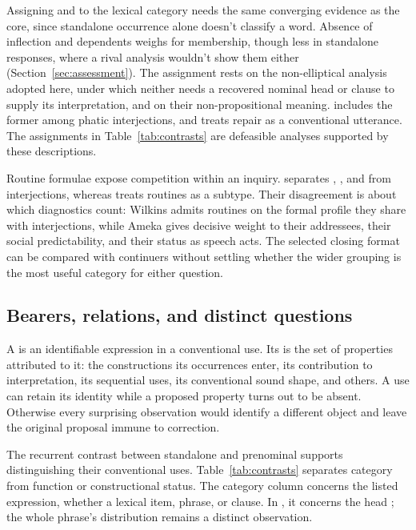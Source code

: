 \documentclass[12pt]{article}
\begin{document}
Assigning  and  to the lexical category
needs the same converging evidence as the core, since standalone occurrence
alone doesn't classify a word. Absence of inflection and dependents weighs for
membership, though less in standalone responses, where a rival analysis
wouldn't show them either (Section~\ref{sec:assessment}). The assignment rests on the
non-elliptical analysis adopted here, under which neither needs a recovered
nominal head or clause to supply its interpretation, and on their
non-propositional meaning. \textcite[114]{ameka1992}
includes the former among phatic interjections, and
\textcite[152]{wilkins1992} treats repair  as a conventional
utterance. The assignments in Table~\ref{tab:contrasts} are defeasible
analyses supported by these descriptions.

Routine formulae expose competition within an inquiry.
\textcite[108--110]{ameka1992} separates , ,
and  from interjections, whereas
\textcite[142]{wilkins1992} treats routines as a subtype. Their
disagreement is about which diagnostics count: Wilkins admits routines on
the formal profile they share with interjections, while Ameka gives
decisive weight to their addressees, their social predictability, and their
status as speech acts. The selected closing format can be
compared with continuers without settling whether the wider grouping
is the most useful category for either question.

\subsection{Bearers, relations, and distinct questions}

A  is an identifiable expression in a conventional use.
Its  is the set of properties attributed to it: the
constructions its occurrences enter, its contribution to interpretation,
its sequential uses, its conventional sound shape, and others. A use can retain its identity
while a proposed property turns out to be absent. Otherwise every
surprising observation would identify a different object and leave the
original proposal immune to correction.

The recurrent contrast between standalone and prenominal 
supports distinguishing their conventional uses. Table~\ref{tab:contrasts}
separates category from function or constructional status. The category
column concerns the listed expression, whether a lexical item, phrase,
or clause. In , it concerns the head ;
the whole phrase's distribution remains a distinct observation.
\end{document}
